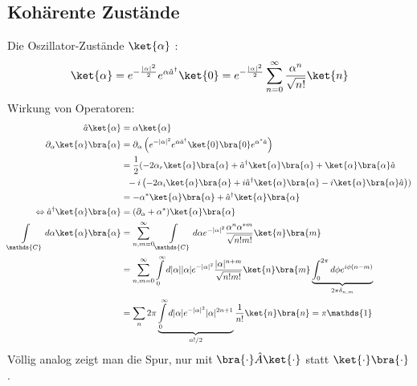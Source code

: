 \subsection{Kohärente Zustände}
Die Oszillator-Zustände $\ket{\alpha}$ :
\begin{align*}
  \ket{\alpha} = e^{-\frac{|\alpha|^2}{2}} e^{\alpha \hat{a}^\dagger}\ket{0} = e^{-\frac{|\alpha|^2}{2}} \sum\limits_{n=0}^{\infty} \frac{\alpha^n}{\sqrt{n!}} \ket{n}
\end{align*}
Wirkung von Operatoren:
\begin{align*}
  \hat a\ket{\alpha} &= \alpha\ket{\alpha}\\
  \partial_\alpha \ket{\alpha}\bra{\alpha} &= \partial_\alpha \left( e^{-|\alpha|^2} e^{\alpha\hat a^\dagger}\ket{0}\bra{0}e^{\alpha^*\hat a} \right)\\
  &= \frac12 ( -2\alpha_r \ket{\alpha}\bra{\alpha}+ \hat a^\dagger \ket{\alpha}\bra{\alpha} + \ket{\alpha}\bra{\alpha} \hat a\\
  &~~ - i\left(  -2\alpha_i\ket{\alpha}\bra{\alpha}+ i \hat a^\dagger \ket{\alpha}\bra{\alpha} - i \ket{\alpha}\bra{\alpha} \hat a\right))\\
  &= -\alpha^* \ket{\alpha}\bra{\alpha} + \hat a^\dagger \ket{\alpha}\bra{\alpha}\\
  \Leftrightarrow \hat a^\dagger \ket{\alpha}\bra{\alpha} &= (\partial_\alpha + \alpha^*)\ket{\alpha}\bra{\alpha}\\
  \int\limits_\mathds{C} d\alpha \ket{\alpha}\bra{\alpha} &= \sum\limits_{n,m=0}^\infty \int\limits_\mathds{C} d\alpha e^{-|\alpha|^2} \frac{\alpha^n \alpha^{*m}}{\sqrt{n!m!}}\ket{n}\bra{m}\\
  &= \sum\limits_{n,m=0}^\infty \int\limits_0^\infty d|\alpha| |\alpha| e^{-|\alpha|^2} \frac{|\alpha|^{n+m}}{\sqrt{n!m!}}\ket{n}\bra{m} \underbrace{\int_0^{2\pi} d\phi e^{i\phi(n-m)}}_{2\pi \delta_{n,m}}\\
  &= \sum\limits_n 2\pi \underbrace{\int\limits_0^\infty d|\alpha| e^{-|\alpha|^2} |\alpha|^{2n+1}}_{n!/2} \frac{1}{n!}\ket{n}\bra{n} = \pi \mathds{1}
\end{align*}
Völlig analog zeigt man die Spur, nur mit $\bra{\cdot} \hat A \ket{\cdot}$ statt $\ket{\cdot}\bra{\cdot}$.\\

